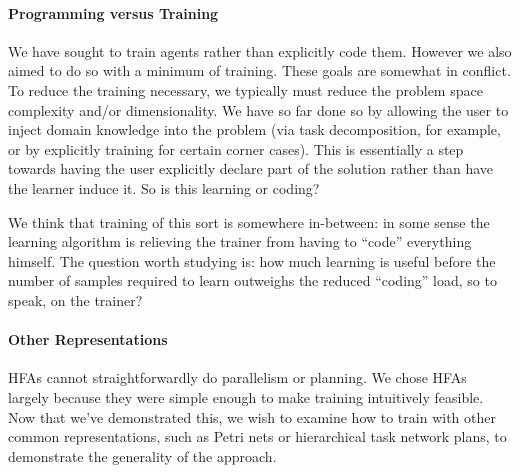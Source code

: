 \paragraph*{Programming versus Training}  We have sought to train agents rather than explicitly code them.  However we also aimed to do so with a minimum of training.  These goals are somewhat in conflict.  To reduce the training necessary, we typically must reduce the problem space complexity and/or dimensionality.  We have so far done so by allowing the user to inject domain knowledge into the problem (via task decomposition, for example, or by explicitly training for certain corner cases).  This is essentially a step towards having the user explicitly declare part of the solution rather than have the learner induce it.  So is this learning or coding?

We think that training of this sort is somewhere in-between: in some sense the learning algorithm is relieving the trainer from having to ``code'' everything himself.  The question worth studying is: how much learning is useful before the number of samples required to learn outweighs the reduced ``coding'' load, so to speak, on the trainer?

\paragraph*{Other Representations}  HFAs cannot straightforwardly do parallelism or planning.  We chose HFAs largely because they were simple enough to make training intuitively feasible.  Now that we've demonstrated this, we wish to examine how to train with other common representations, such as Petri nets or hierarchical task network plans, to demonstrate the generality of the approach.